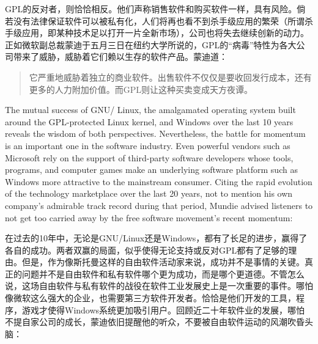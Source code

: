 \fi

\ifdefined\chs
GPL的反对者，则恰恰相反。他们声称销售软件和购买软件一样，具有风险。倘若没有法律保证软件可以被私有化，人们将再也看不到杀手级应用的繁荣（所谓杀手级应用，即某种技术足以打开一片全新市场），公司也将失去继续创新的动力。正如微软副总裁蒙迪于五月三日在纽约大学所说的，GPL的``病毒''特性为各大公司带来了威胁，威胁着它们赖以生存的软件产品。蒙迪道：
\begin{quote}
它严重地威胁着独立的商业软件。出售软件不仅仅是要收回发行成本，还有更多的人力附加价值。而GPL则让这种买卖变成天方夜谭。
\end{quote}

\fi

\ifdefined\eng
The mutual success of GNU/ Linux, the amalgamated operating system built around the GPL-protected Linux kernel, and Windows over the last 10 years reveals the wisdom of both perspectives. Nevertheless, the battle for momentum is an important one in the software industry. Even powerful vendors such as Microsoft rely on the support of third-party software developers whose tools, programs, and computer games make an underlying software platform such as Windows more attractive to the mainstream consumer. Citing the rapid evolution of the technology marketplace over the last 20 years, not to mention his own company's admirable track record during that period, Mundie advised listeners to not get too carried away by the free software movement's recent momentum:
\fi

\ifdefined\chs
在过去的10年中，无论是GNU/Linux还是Windows，都有了长足的进步，赢得了各自的成功。两者双赢的局面，似乎使得无论支持或反对GPL都有了足够的理由。但是，作为像斯托曼这样的自由软件活动家来说，成功并不是事情的关键。真正的问题并不是自由软件和私有软件哪个更为成功，而是哪个更道德。不管怎么说，这场自由软件与私有软件的战役在软件工业发展史上是一次重要的事件。哪怕像微软这么强大的企业，也需要第三方软件开发者。恰恰是他们开发的工具，程序，游戏才使得Windows系统更加吸引用户。回顾近二十年软件业的发展，哪怕不提自家公司的成长，蒙迪依旧提醒他的听众，不要被自由软件运动的风潮吹昏头脑：
\fi

